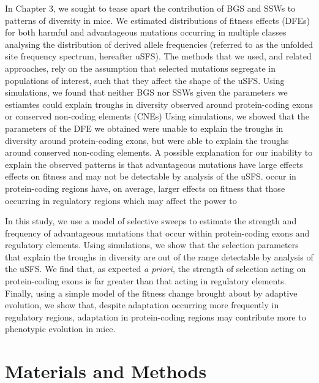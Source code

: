 In Chapter 3, we sought to tease apart the contribution of BGS and SSWs to patterns of diversity in mice. We estimated distributions of fitness effects (DFEs) for both harmful and advantageous mutations occurring in multiple classes analysing the distribution of derived allele frequencies (referred to as the unfolded site frequency spectrum, hereafter uSFS). The methods that we used, and related approaches, rely on the assumption that selected mutations segregate in populations of interest, such that they affect the shape of the uSFS. Using simulations, we found that neither BGS nor SSWs given the parameters we estiamtes could explain troughs in diversity observed around protein-coding exons or conserved non-coding elements (CNEs)
Using simulations, we showed that the parameters of the DFE we obtained were unable to explain the troughs in diversity around protein-coding exons, but were able to explain the troughs around conserved non-coding elements. A possible explanation for our inability to explain the observed patterns is that advantageous mutations have large effects effects on fitness and may not be detectable by analysis of the uSFS. occur in protein-coding regions have, on average, larger effects on fitness that those occurring in regulatory regions which may affect the power to 

In this study, we use a model of selective sweeps to estimate the strength and frequency of advantageous mutations that occur within protein-coding exons and regulatory elements. Using simulations, we show that the selection parameters that explain the troughs in diversity are out of the range detectable by analysis of the uSFS.  We find that, as expected \textit{a priori}, the strength of selection acting on protein-coding exons is far greater than that acting in regulatory elements. Finally, using a simple model of the fitness change brought about by adaptive evolution, we show that, despite adaptation occurring more frequently in regulatory regions, adaptation in protein-coding regions may contribute more to phenotypic evolution in mice.

%
%
\section{Materials and Methods}


